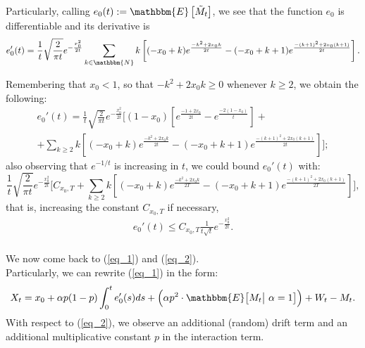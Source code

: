 \documentclass[11pt, a4paper]{article}
\begin{document}
Particularly, calling $e_0(t) := \mathbbm{E}\left[ \tilde{M}_t \right]$, we see that the function $e_0$ is differentiable and its derivative is \[ e_0'(t) = \frac{1}{t} \sqrt{\frac{2}{\pi t}} e^{- \frac{x_0^2}{2t}} \sum_{k \in \mathbbm{N}} k \left[ (-x_0+k) e^{\frac{-k^2+2x_0k}{2t}} - (-x_0+k+1)e^{\frac{-(k+1)^2+2x_0(k+1)}{2t}} \right]. \]

Remembering that $x_0 < 1$, so that $-k^2 + 2x_0 k \geq 0$ whenever $k \geq 2$, we obtain the following: \begin{multline*} e_0'(t) = \frac{1}{t} \sqrt{\frac{2}{\pi t}} e^{- \frac{x_0^2}{2t}} \Bigg[ (1-x_0) \left[ e^{\frac{-1+2x_0}{2t}} - e^{\frac{-2(1-x_0)}{t}} \right] + \\ + \sum_{k \geq 2} k \left[ (-x_0+k) e^{\frac{-k^2+2x_0k}{2t}} - (-x_0+k+1)e^{\frac{-(k+1)^2+2x_0(k+1)}{2t}} \right] \Bigg]; \end{multline*}
also observing that $e^{-1/t}$ is increasing in $t$, we could bound $e_0'(t)$ with: \[ \frac{1}{t} \sqrt{\frac{2}{\pi t}} e^{- \frac{x_0^2}{2t}} \Bigg[ C_{x_0, T} + \sum_{k \geq 2} k \left[ (-x_0+k) e^{\frac{-k^2+2x_0k}{2T}} - (-x_0+k+1)e^{\frac{-(k+1)^2+2x_0(k+1)}{2T}} \right] \Bigg], \] that is, increasing the constant $C_{x_0, T}$ if necessary, \begin{align*} e_0'(t) \leq C_{x_0, T} \frac{1}{t \sqrt{t}} e^{- \frac{x_0^2}{2t}}. \\ \end{align*}

We now come back to (\ref{eq_1}) and (\ref{eq_2}). \\
Particularly, we can rewrite (\ref{eq_1}) in the form: \begin{equation} \label{eq_1_rew} X_t = x_0 + \alpha p (1-p) \int_0^t e_0'(s) ds + \Big( \alpha p^2 \cdot \mathbbm{E} \big[ M_t \big| \  \alpha = 1 \big. \big] \Big) + W_t - M_t. \end{equation}
With respect to (\ref{eq_2}), we observe an additional (random) drift term and an additional multiplicative constant $p$ in the interaction term. \\
\end{document}
